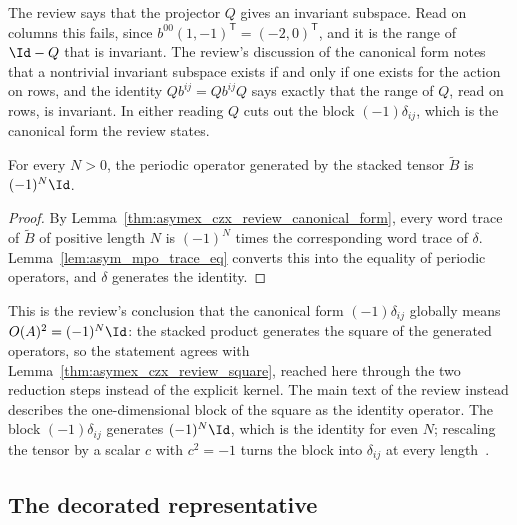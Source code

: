 The review says that the projector $Q$ gives an invariant subspace. Read
on columns this fails, since $b^{00}(1,-1)^{\mathsf T}=(-2,0)^{\mathsf T}$,
and it is the range of $\Id-Q$ that is invariant. The review's discussion of
the canonical form notes that a nontrivial invariant subspace exists if and
only if one exists for the action on rows, and the identity
$Qb^{ij}=Qb^{ij}Q$ says exactly that the range of $Q$, read on rows, is
invariant. In either reading $Q$ cuts out the block $(-1)\delta_{ij}$, which
is the canonical form the review states.

\begin{lemma}
    \label{thm:asymex_czx_review_global_square}
    \leanok
    For every $N>0$, the periodic operator generated by the stacked
    tensor $\widetilde B$ is $(-1)^N\Id$.
\end{lemma}

\begin{proof}
    \leanok
    By Lemma~\ref{thm:asymex_czx_review_canonical_form}, every word trace
    of $\widetilde B$ of positive length $N$ is $(-1)^N$ times the corresponding word
    trace of $\delta$. Lemma~\ref{lem:asym_mpo_trace_eq} converts this into
    the equality of periodic operators, and $\delta$ generates the identity.
\end{proof}

This is the review's conclusion that the canonical form $(-1)\delta_{ij}$
globally means $O(A)^2=(-1)^N\Id$: the stacked product generates the
square of the generated operators, so the statement agrees with
Lemma~\ref{thm:asymex_czx_review_square}, reached here through the two
reduction steps instead of the explicit kernel.
The main text of the review instead describes the one-dimensional block
of the square as the identity operator. The block $(-1)\delta_{ij}$
generates $(-1)^N\Id$, which is the identity for even $N$; rescaling the
tensor by a scalar $c$ with $c^2=-1$ turns the block into $\delta_{ij}$ at
every length~\cite{gap:mpu_czx_tensor_normalization}.

\subsection{The decorated representative}%
\label{sec:asymex_czx_decorated}

